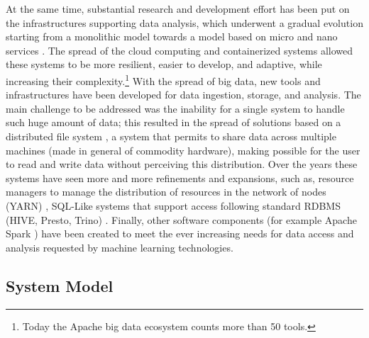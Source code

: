 At the same time, substantial research and development effort has been put on the infrastructures supporting data analysis, which underwent a gradual evolution starting from a monolithic model towards a model based on micro and nano services \cite{kratzke2018brief}. The spread of the cloud computing and  containerized systems allowed these systems to be more resilient, easier to develop, and adaptive, while increasing their complexity.\footnote{Today the Apache big data ecosystem counts more than 50 tools.}
With the spread of big data, new tools and infrastructures have been developed for data ingestion, storage, and analysis. The main challenge to be addressed was the inability for a single system to handle such huge amount of data; this resulted in the spread of solutions based on a distributed file system \cite{blomer2015survey}, a system that permits to share data across multiple machines (made in general of commodity hardware), making possible for the user to read and write data without perceiving this distribution. Over the years these systems have seen more and more refinements and expansions, such as, resource managers to manage the distribution of resources in the network of nodes (YARN) \cite{kulkarni2014survey}, SQL-Like systems that support access following standard RDBMS (HIVE, Presto, Trino) \cite{thusoo2009hive,sethi2019presto}. Finally, other software components (for example Apache Spark \cite{salloum2016big}) have been created to meet the ever increasing needs for data access and analysis requested by machine learning technologies.
\subsection{System Model}\label{sec:systemmodel}

